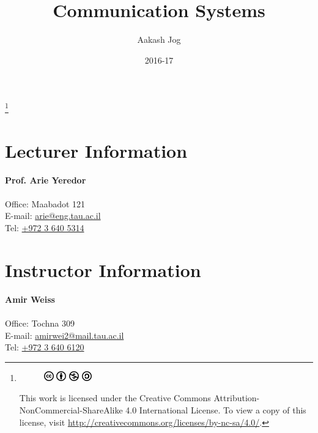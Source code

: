 \documentclass[titlepage, fleqn, a4paper, 12pt, twoside]{article}
\title{Communication Systems}
\author{Aakash Jog}
\date{2016-17}
\theoremstyle{definition}
\theoremstyle{theorem}
\newcommand\blfootnote[1]{%
	\begingroup
	\renewcommand\thefootnote{}\footnote{#1}%
	\addtocounter{footnote}{-1}%
	\endgroup
}
\begin{document}
\begin{titlepage}
\maketitle
\end{titlepage}
\restoregeometry

\blfootnote
{
	\begin{figure}[H]
		\includegraphics[height = 12pt]{cc.pdf}
		\includegraphics[height = 12pt]{by.pdf}
		\includegraphics[height = 12pt]{nc.pdf}
		\includegraphics[height = 12pt]{sa.pdf}
	\end{figure}
	This work is licensed under the Creative Commons Attribution-NonCommercial-ShareAlike 4.0 International License. To view a copy of this license, visit \url{http://creativecommons.org/licenses/by-nc-sa/4.0/}.
} %

\tableofcontents

\clearpage
\section{Lecturer Information}

\textbf{Prof. Arie Yeredor}\\
~\\
Office: Maabadot 121\\
E-mail: \href{mailto:arie@eng.tau.ac.il}{arie@eng.tau.ac.il}\\
Tel: \href{tel:+97236405314}{+972 3 640 5314}\\

\section{Instructor Information}

\textbf{Amir Weiss}\\
~\\
Office: Tochna 309\\
E-mail: \href{mailto:amirwei2@mail.tau.ac.il}{amirwei2@mail.tau.ac.il}\\
Tel: \href{tel:+97236406120}{+972 3 640 6120}\\
\end{document}
